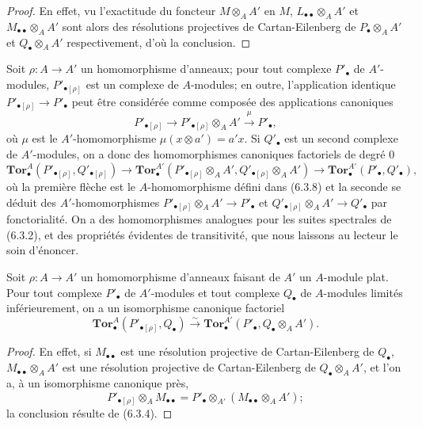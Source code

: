 \begin{proof}
En effet, vu l'exactitude du foncteur $M\otimes_A A'$ en $M$,
$L_{\bullet\bullet}\otimes_A A'$ et $M_{\bullet\bullet}\otimes_A A'$ sont
alors des résolutions projectives de Cartan-Eilenberg de
$P_\bullet\otimes_A A'$ et $Q_\bullet\otimes_A A'$ respectivement, d'où la
conclusion.
\end{proof}

\begin{env}[6.3.10]
Soit $\rho:A\to A'$ un homomorphisme d'anneaux; pour tout complexe
$P'_\bullet$ de $A'$-modules, $P'_{\bullet[\rho]}$ est un complexe de
$A$-modules; en outre, l'application identique
$P'_{\bullet[\rho]}\to P'_\bullet$ peut être considérée comme composée des
applications canoniques
\[
  P'_{\bullet[\rho]}\longrightarrow
  P'_{\bullet[\rho]}\otimes_A A'
  \xrightarrow{\mu}P'_\bullet,
\]
où $\mu$ est le $A'$-homomorphisme $\mu(x\otimes a')=a'x$. Si $Q'_\bullet$
est un second complexe de $A'$-modules, on a donc des homomorphismes
canoniques factoriels de degré 0
\[
  \mathbf{Tor}_\bullet^A(P'_{\bullet[\rho]},Q'_{\bullet[\rho]})
  \longrightarrow
  \mathbf{Tor}_\bullet^{A'}
  (P'_{\bullet[\rho]}\otimes_A A',Q'_{\bullet[\rho]}\otimes_A A')
  \longrightarrow
  \mathbf{Tor}_\bullet^{A'}(P'_\bullet,Q'_\bullet),
  \tag{6.3.10.1}\label{III.6.3.10.1.fr}
\]
où la première flèche est le $A$-homomorphisme défini dans (6.3.8) et la
seconde se déduit des $A'$-homomorphismes
$P'_{\bullet[\rho]}\otimes_A A'\to P'_\bullet$ et
$Q'_{\bullet[\rho]}\otimes_A A'\to Q'_\bullet$ par fonctorialité. On a des
homomorphismes analogues pour les suites spectrales de (6.3.2), et des
propriétés évidentes de transitivité, que nous laissons au lecteur le soin
d'énoncer.
\end{env}

\begin{proposition}[6.3.11]
Soit $\rho:A\to A'$ un homomorphisme d'anneaux faisant de $A'$ un
$A$-module plat. Pour tout complexe $P'_\bullet$ de $A'$-modules et tout
complexe $Q_\bullet$ de $A$-modules limités inférieurement, on a un
isomorphisme canonique factoriel
\[
  \mathbf{Tor}_\bullet^A(P'_{\bullet[\rho]},Q_\bullet)
  \xrightarrow{\sim}
  \mathbf{Tor}_\bullet^{A'}(P'_\bullet,Q_\bullet\otimes_A A').
  \tag{6.3.11.1}\label{III.6.3.11.1.fr}
\]
\end{proposition}

\begin{proof}
En effet, si $M_{\bullet\bullet}$ est une résolution projective de
Cartan-Eilenberg de $Q_\bullet$, $M_{\bullet\bullet}\otimes_A A'$ est une
résolution projective de Cartan-Eilenberg de $Q_\bullet\otimes_A A'$, et
l'on a, à un isomorphisme canonique près,
\[
  P'_{\bullet[\rho]}\otimes_A M_{\bullet\bullet}
  =P'_\bullet\otimes_{A'}(M_{\bullet\bullet}\otimes_A A');
\]
la conclusion résulte de (6.3.4).
\end{proof}

